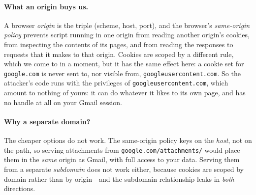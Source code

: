 \paragraph{What an origin buys us.}
A browser \emph{origin} is the triple (scheme, host, port), and the
browser's \emph{same-origin policy} prevents script running in one
origin from reading another origin's cookies, from inspecting the
contents of its pages, and from reading the responses to requests that
it makes to that origin.
Cookies are scoped by a different rule, which we come to in a moment,
but it has the same effect here: a cookie set for \texttt{google.com}
is never sent to, nor visible from, \texttt{googleusercontent.com}.
So the attacker's code runs with the privileges of
\texttt{googleusercontent.com}, which amount to nothing of yours: it
can do whatever it likes to its own page, and has no handle at all on
your Gmail session.

\paragraph{Why a separate domain?}
The cheaper options do not work.
The same-origin policy keys on the \emph{host}, not on the path, so
serving attachments from \texttt{google.com/attachments/} would place
them in the \emph{same} origin as Gmail, with full access to your data.
Serving them from a separate \emph{subdomain} does not work either,
because cookies are scoped by domain rather than by origin---and the
subdomain relationship leaks in \emph{both}
directions.

